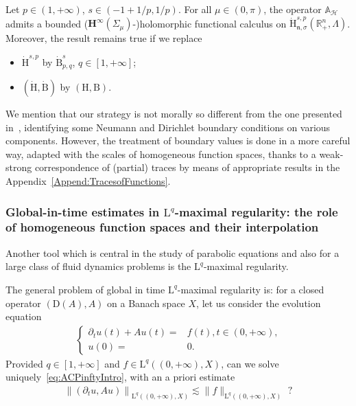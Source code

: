 \documentclass[AHL,Unicode,longabstracts,published]{cedram}
\newcommand{\bbA}{\mathbb{A}}
\newcommand{\bbR}{\mathbb{R}}
\newcommand{\rmH}{\mathrm{H}}%
\newcommand{\rmB}{\mathrm{B}}
\newcommand{\rmD}{\mathrm{D}}
\newcommand{\rmL}{\mathrm{L}}
\newcommand{\clH}{\mathcal{H}}
\newcommand{\bfH}{\mathbf{H}}
\newcommand{\fkn}{\mathfrak{n}}
\begin{document}
\begin{theo}\label{thm:HinftyFuncCalcHodgeStokesMaxwellIntro}
Let $p\in(1,+\infty)$, $s\in(-1+1/p,1/p)$. For all $\mu\in (0,\pi)$, the operator $\bbA_{\clH}$ admits a bounded ($\bfH^{\infty}(\Sigma_\mu)$-)holomorphic functional calculus on $\dot{\rmH}^{s,p}_{\fkn,\sigma}(\bbR^n_+,\Lambda)$.
Moreover, the result remains true if we replace
\begin{itemize}
\item $\dot{\rmH}^{s,p}$ by $\dot{\rmB}^{s}_{p,q}$, $q\in[1,+\infty]$;
\item $(\dot{\rmH},\dot{\rmB})$ by $({\rmH},{\rmB})$.
\end{itemize}
\end{theo}

We mention that our strategy is not morally so different from the one presented in~\cite[Beginning~of~Section~4]{GeissertHeckTrunk2013}, identifying some Neumann and Dirichlet boundary conditions on various components. However, the treatment of boundary values is done in a more careful way, adapted with the scales of homogeneous function spaces, thanks to a weak-strong correspondence of (partial) traces by means of appropriate results in the Appendix~\ref{Append:TracesofFunctions}.

\subsubsection{Global-in-time estimates in \texorpdfstring{$\rmL^q$}{Lq}-maximal regularity: the role of homogeneous function spaces and their interpolation}

Another tool which is central in the study of parabolic equations and also for a large class of fluid dynamics problems is the $\rmL^q$-maximal regularity.

The general problem of global in time $\rmL^q$-maximal regularity is: for a closed operator $(\rmD(A),A)$ on a Banach space $X$, let us consider the evolution equation
\begin{align}\label{eq:ACPinftyIntro}
\left\{
\begin{array}{rl}
\partial_t u(t) +Au(t) =& f(t), t\in(0,+\infty) \text{,}\\
u(0) =& 0.
\end{array}
\right.
\end{align}
Provided $q\in[1,+\infty]$ and $f\in\rmL^{q}((0,+\infty),X)$, can we solve uniquely~\eqref{eq:ACPinftyIntro}, with an a priori estimate
\begin{align}\label{ineq:estimateMaxRegIntro}
\left\| (\partial_t u, Au)\right\|_{\rmL^q\left((0,+\infty),X\right)} \lesssim \| f\|_{\rmL^q((0,+\infty),X)} \text{ ?}
\end{align}
\end{document}
